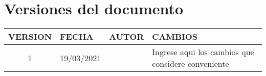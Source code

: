 \newpage
\section{Versiones del documento}

\begin{table}[H]
\begin{tabular}{|c|m{1.6cm}|m{1cm}|m{6cm}|} \hline
\cellcolor{colorTerciario}\color{white}VERSION & \cellcolor{colorTerciario}\color{white}FECHA & \cellcolor{colorTerciario}\color{white}AUTOR & \cellcolor{colorTerciario}\color{white}CAMBIOS \\ \hline
 1 & 19/03/2021 &   &  Ingrese aqui los cambios que considere conveniente \\ \hline
\end{tabular}
\end{table}